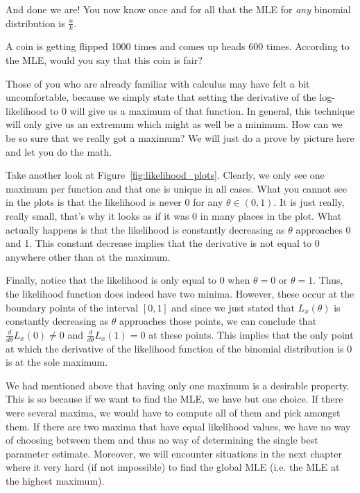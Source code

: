 And done we are! You now know once and for all that the MLE for \emph{any} binomial distribution is $ \frac{n}{k} $.

\begin{Exercise}
A coin is getting flipped 1000 times and comes up heads 600 times. According to the MLE, would you say that this coin is fair?
\end{Exercise}

Those of you who are already familiar with calculus may have felt a bit uncomfortable, because we simply state that setting the derivative of the log-likelihood
to 0 will give us a maximum of that function. In general, this technique will only give us an extremum which might as well be a minimum. How can we be so sure that
we really got a maximum? We will just do a prove by picture here and let you do the math. 

Take another look at Figure~\ref{fig:likelihood_plots}. Clearly, we only
see one maximum per function and that one is unique in all cases. 
What you cannot see in the plots is that the likelihood is never 0 for any $ \theta \in (0,1) $. It is just
really, really small, that's why it looks as if it was 0 in many places in the plot. What actually happens is that the likelihood is constantly decreasing as
$ \theta $ approaches 0 and 1. This constant decrease implies that the derivative is not equal to $ 0 $ anywhere other than at the maximum.

Finally, notice that the likelihood is only equal to 0 when $ \theta = 0 $ or $ \theta = 1 $. Thus, the likelihood function does indeed have two minima. However, these 
occur at the boundary points of the interval $ [0,1] $ and since we just stated that $ L_{x}(\theta) $ is constantly decreasing as $ \theta $ approaches those points,
we can conclude that $ \frac{d}{d\theta}L_{x}(0) \not = 0 $ and $ \frac{d}{d\theta}L_{x}(1) = 0 $ at these points. This implies that the only point at which the
derivative of the likelihood function of the binomial distribution is $ 0 $ is at the sole maximum.

We had mentioned above that having only one maximum is a desirable property. This is so because if we want to find the MLE, we have but one choice. If there were
several maxima, we would have to compute all of them and pick amongst them. If there are two maxima that have equal likelihood values, we have no way of choosing
between them and thus no way of determining the single best parameter estimate. Moreover, we will encounter situations in the next chapter where it very hard (if not
impossible) to find the global MLE (i.e. the MLE at the highest maximum).

